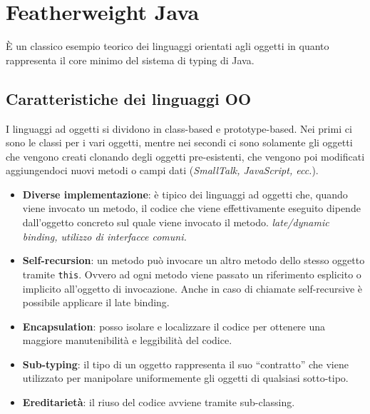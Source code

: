 

\chapter{Featherweight Java}

\`E un classico esempio teorico dei linguaggi orientati agli oggetti in quanto rappresenta il core minimo del sistema di typing di Java.

\section{Caratteristiche dei linguaggi OO}

I linguaggi ad oggetti si dividono in class-based e prototype-based. Nei primi ci sono le classi per i vari oggetti, mentre nei secondi ci sono solamente gli oggetti che vengono creati clonando degli oggetti pre-esistenti, che vengono poi modificati aggiungendoci nuovi metodi o campi dati (\textit{SmallTalk, JavaScript, ecc.}).

\begin{itemize}
	\item \textbf{Diverse implementazione}: è tipico dei linguaggi ad oggetti che, quando viene invocato un metodo, il codice che viene effettivamente eseguito dipende dall'oggetto concreto sul quale viene invocato il metodo. \textit{late/dynamic binding, utilizzo di interfacce comuni.} 
	\item \textbf{Self-recursion}: un metodo può invocare un altro metodo dello stesso oggetto tramite \texttt{this}. Ovvero ad ogni metodo viene passato un riferimento esplicito o implicito all'oggetto di invocazione. Anche in caso di chiamate self-recursive è possibile applicare il late binding.
	\item \textbf{Encapsulation}: posso isolare e localizzare il codice per ottenere una maggiore manutenibilità e leggibilità del codice.
	\item \textbf{Sub-typing}: il tipo di un oggetto rappresenta il suo ``contratto'' che viene utilizzato per manipolare uniformemente gli oggetti di qualsiasi sotto-tipo.
	\item \textbf{Ereditarietà}: il riuso del codice avviene tramite sub-classing.
\end{itemize}

